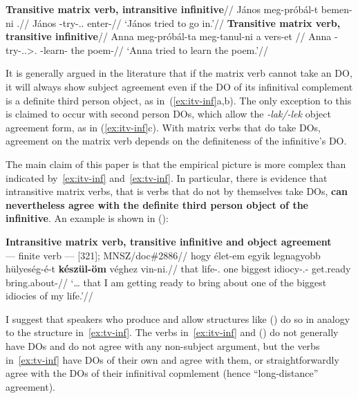 \pex\label{ex:tv-inf}
    \a
    \begingl
        \glpreamble \textbf{Transitive matrix verb, intransitive infinitive}//
        \gla 	János meg-próbál-t \nogloss{[\tss{\Inf}} bemen-ni \nogloss{]}.//
        \glb 	János \Vm-try-\Pst.\Tsg.\Sbj{} enter-\Inf{}//
        \glft 	\enquote*{János tried to go in.}//
    \endgl
    \a
    \begingl
        \glpreamble \textbf{Transitive matrix verb, transitive infinitive}//
        \gla 	Anna meg-próbál-ta \nogloss{[\tss{\Inf}} meg-tanul-ni a vers-et \nogloss{].}//
        \glb 	Anna \Vm-try-\Pst.\Tsg.\Sbj>\Third.\Obj{} \Vm-learn-\Inf{} the poem-\Acc//
        \glft 	\enquote*{Anna tried to learn the poem.}//
    \endgl
\xe

It is generally argued in the literature that if the matrix verb cannot take an
\Acc{} \gls{DO}, it will always show subject agreement even if the \gls{DO} of
its infinitival complement is a definite third person object, as
in~(\ref{ex:itv-inf}a,b). The only exception to this is claimed to occur with
second person \glspl{DO}, which allow the \emph{-lak/-lek} object agreement
form, as in (\ref{ex:itv-inf}c). With matrix verbs that do take \Acc{}
\glspl{DO}, agreement on the matrix verb depends on the definiteness of the
infinitive's \gls{DO}.

The main claim of this paper is that the empirical picture is more complex than
indicated by~\eqref{ex:itv-inf} and~\eqref{ex:tv-inf}. In particular, there is
evidence that intransitive matrix verbs, that is verbs that do not by
themselves take \Acc{} \glspl{DO}, \textbf{can nevertheless agree with the
definite third person object of the infinitive}.  An example is shown
in (\nextx):

\ex \textbf{Intransitive matrix verb, transitive infinitive and object agreement}\\
    \begingl
        \glpreamble \Obj --- finite verb --- \Inf{} [321]; \gls{MNSZ}/doc\#2886//
        \gla 	\nogloss{\dots{}} hogy élet-em egyik legnagyobb hülyeség-é-t
        \textbf{készül-öm} {véghez vin-ni}.//
        \glb 	that life-\Fsg.\Poss{} one biggest
        idiocy-\Tsg.\Poss-\Acc{} get.ready bring.about-\Inf{}//
        \glft 	\enquote*{\dots{} that I am getting ready to bring about one
        of the biggest idiocies of my life.}//
    \endgl
\xe

I suggest that speakers who produce and allow structures like (\lastx) do so in
analogy to the structure in~\eqref{ex:tv-inf}. The verbs in~\eqref{ex:itv-inf}
and (\lastx) do not generally have \Acc{} \glspl{DO} and do not agree with any
non-subject argument, but the verbs in~\eqref{ex:tv-inf} have \Acc{} \glspl{DO}
of their own and agree with them, or straightforwardly agree with the
\glspl{DO} of their infinitival copmlement (hence \enquote{long-distance}
agreement).

